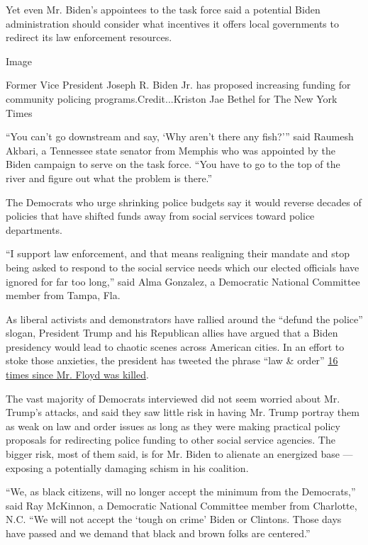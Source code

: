 Yet even Mr. Biden's appointees to the task force said a potential Biden
administration should consider what incentives it offers local
governments to redirect its law enforcement resources.

Image

Former Vice President Joseph R. Biden Jr. has proposed increasing
funding for community policing programs.Credit...Kriston Jae Bethel for
The New York Times

``You can't go downstream and say, `Why aren't there any fish?''' said
Raumesh Akbari, a Tennessee state senator from Memphis who was appointed
by the Biden campaign to serve on the task force. ``You have to go to
the top of the river and figure out what the problem is there.''

The Democrats who urge shrinking police budgets say it would reverse
decades of policies that have shifted funds away from social services
toward police departments.

``I support law enforcement, and that means realigning their mandate and
stop being asked to respond to the social service needs which our
elected officials have ignored for far too long,'' said Alma Gonzalez, a
Democratic National Committee member from Tampa, Fla.

As liberal activists and demonstrators have rallied around the ``defund
the police'' slogan, President Trump and his Republican allies have
argued that a Biden presidency would lead to chaotic scenes across
American cities. In an effort to stoke those anxieties, the president
has tweeted the phrase ``law \& order''
\href{https://twitter.com/search?q=Law\%20Order\%20(from\%3Arealdonaldtrump)\&src=typed_query\&f=live}{16
times since Mr. Floyd was killed}.

The vast majority of Democrats interviewed did not seem worried about
Mr. Trump's attacks, and said they saw little risk in having Mr. Trump
portray them as weak on law and order issues as long as they were making
practical policy proposals for redirecting police funding to other
social service agencies. The bigger risk, most of them said, is for Mr.
Biden to alienate an energized base --- exposing a potentially damaging
schism in his coalition.

``We, as black citizens, will no longer accept the minimum from the
Democrats,'' said Ray McKinnon, a Democratic National Committee member
from Charlotte, N.C. ``We will not accept the `tough on crime' Biden or
Clintons. Those days have passed and we demand that black and brown
folks are centered.''

